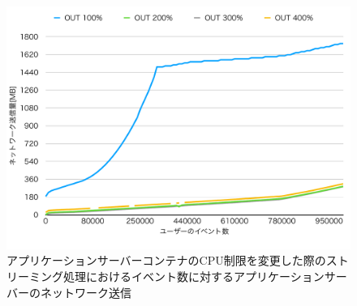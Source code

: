 \documentclass[../../../../../main]{subfiles}
\begin{document}
    \begin{figure}[H]
        \centering
        \includegraphics[width=12cm]{graph}
        \caption{アプリケーションサーバーコンテナのCPU制限を変更した際のストリーミング処理におけるイベント数に対するアプリケーションサーバーのネットワーク送信}
        \label{fig:stream-change-app-cpu-limit-app-net-out-app_1024-db_1_1024}
    \end{figure}
\end{document}
